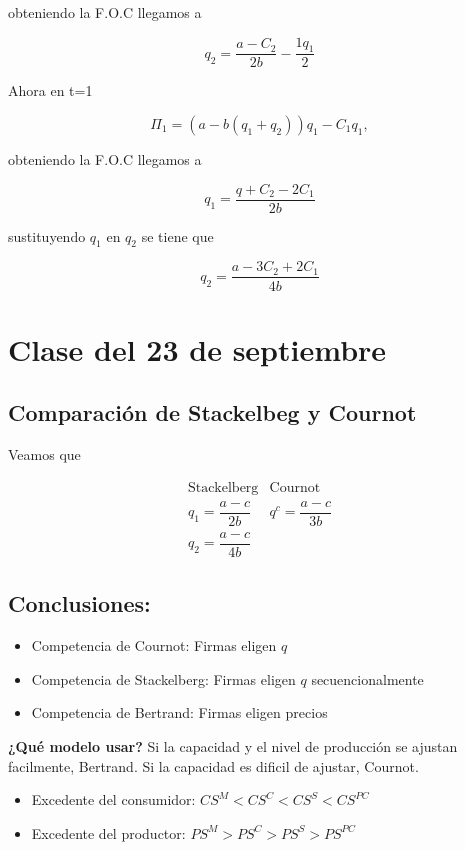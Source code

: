 \documentclass[letterpaper,12pt,twocolumn]{report}
\begin{document}
obteniendo la F.O.C llegamos a

$$ q_2 = \frac{a-C_2}{2b}-\frac{1q_1}{2} $$

Ahora en t=1

$$ \Pi_1 = (a-b(q_1+q_2))q_1-C_1q_1, $$

obteniendo la F.O.C llegamos a

$$ q_1=\frac{q+C_2-2C_1}{2b}$$

sustituyendo $q_1$ en $q_2$ se tiene que 

$$ q_2= \frac{a-3C_2+2C_1}{4b} $$

\section{Clase del 23 de septiembre}

\subsection*{Comparación de Stackelbeg y Cournot}

Veamos que 

$$\begin{matrix}
	\text{Stackelberg} & \text{Cournot}\\
	
	q_1= \dfrac{a-c}{2b} & q^c=\dfrac{a-c}{3b}\\
	
	q_2= \dfrac{a-c}{4b}
	
\end{matrix}
$$

\subsection*{Conclusiones:}

\begin{itemize}
	\item Competencia de Cournot: Firmas eligen $q$
	\item Competencia de Stackelberg: Firmas eligen $q$ secuencionalmente
	\item Competencia de Bertrand: Firmas eligen precios
\end{itemize}

\textbf{¿Qué modelo usar?} Si la capacidad y el nivel de producción se ajustan facilmente, Bertrand. Si la capacidad es dificil de ajustar, Cournot.

\begin{itemize}
	\item Excedente del consumidor: $CS^M<CS^C<CS^S<CS^{PC}$
	\item Excedente del productor: $PS^M>PS^C>PS^S>PS^{PC}$
\end{itemize}
\end{document}
